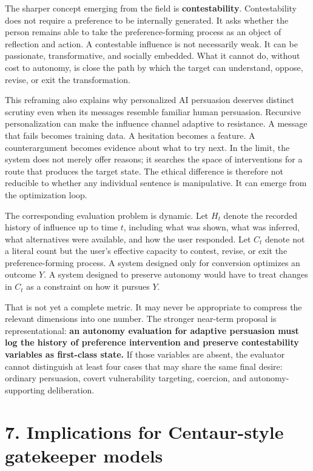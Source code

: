 \documentclass[
  10pt,
]{article}
\begin{document}
The sharper concept emerging from the field is \textbf{contestability}.
Contestability does not require a preference to be internally generated.
It asks whether the person remains able to take the preference-forming
process as an object of reflection and action. A contestable influence
is not necessarily weak. It can be passionate, transformative, and
socially embedded. What it cannot do, without cost to autonomy, is close
the path by which the target can understand, oppose, revise, or exit the
transformation.

This reframing also explains why personalized AI persuasion deserves
distinct scrutiny even when its messages resemble familiar human
persuasion. Recursive personalization can make the influence channel
adaptive to resistance. A message that fails becomes training data. A
hesitation becomes a feature. A counterargument becomes evidence about
what to try next. In the limit, the system does not merely offer
reasons; it searches the space of interventions for a route that
produces the target state. The ethical difference is therefore not
reducible to whether any individual sentence is manipulative. It can
emerge from the optimization loop.

The corresponding evaluation problem is dynamic. Let \(H_t\) denote the
recorded history of influence up to time \(t\), including what was
shown, what was inferred, what alternatives were available, and how the
user responded. Let \(C_t\) denote not a literal count but the user's
effective capacity to contest, revise, or exit the preference-forming
process. A system designed only for conversion optimizes an outcome
\(Y\). A system designed to preserve autonomy would have to treat
changes in \(C_t\) as a constraint on how it pursues \(Y\).

That is not yet a complete metric. It may never be appropriate to
compress the relevant dimensions into one number. The stronger near-term
proposal is representational: \textbf{an autonomy evaluation for
adaptive persuasion must log the history of preference intervention and
preserve contestability variables as first-class state.} If those
variables are absent, the evaluator cannot distinguish at least four
cases that may share the same final desire: ordinary persuasion, covert
vulnerability targeting, coercion, and autonomy-supporting deliberation.

\section{7. Implications for Centaur-style gatekeeper
models}\label{implications-for-centaur-style-gatekeeper-models}
\end{document}
